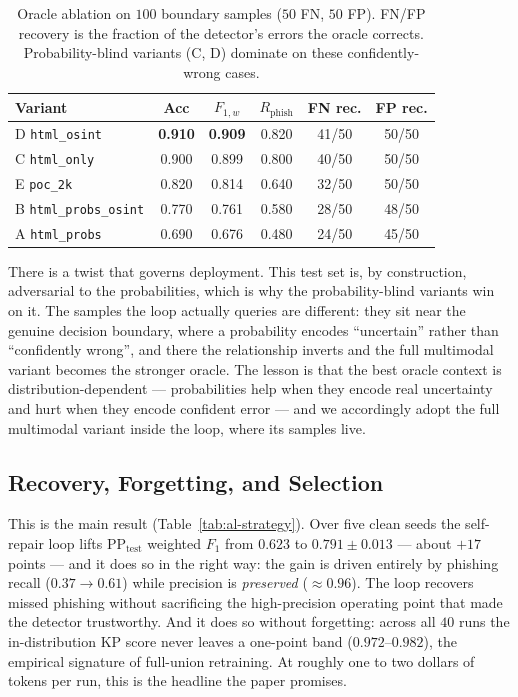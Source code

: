 \begin{table}[H]
\centering
\caption{Oracle ablation on $100$ boundary samples ($50$ FN, $50$ FP). FN/FP
recovery is the fraction of the detector's errors the oracle corrects.
Probability-blind variants (C, D) dominate on these confidently-wrong cases.}
\label{tab:oracle}
\small
\begin{tabular}{@{}lccccc@{}}
\toprule
Variant & Acc & $F_{1,w}$ & $R_{\text{phish}}$ & FN rec. & FP rec. \\
\midrule
D \texttt{html\_osint}        & \textbf{0.910} & \textbf{0.909} & 0.820 & 41/50 & 50/50 \\
C \texttt{html\_only}         & 0.900 & 0.899 & 0.800 & 40/50 & 50/50 \\
E \texttt{poc\_2k}            & 0.820 & 0.814 & 0.640 & 32/50 & 50/50 \\
B \texttt{html\_probs\_osint} & 0.770 & 0.761 & 0.580 & 28/50 & 48/50 \\
A \texttt{html\_probs}        & 0.690 & 0.676 & 0.480 & 24/50 & 45/50 \\
\bottomrule
\end{tabular}
\end{table}

There is a twist that governs deployment. This test set is, by construction,
adversarial to the probabilities, which is why the probability-blind variants
win on it. The samples the loop actually queries are different: they sit near
the genuine decision boundary, where a probability encodes ``uncertain'' rather
than ``confidently wrong'', and there the relationship inverts and the full
multimodal variant becomes the stronger oracle. The lesson is that the best
oracle context is distribution-dependent --- probabilities help when they encode
real uncertainty and hurt when they encode confident error --- and we accordingly
adopt the full multimodal variant inside the loop, where its samples live.

\subsection{Recovery, Forgetting, and Selection}
\label{ssec:eval-recovery}

This is the main result (Table~\ref{tab:al-strategy}). Over five clean seeds the
self-repair loop lifts $\mathrm{PP_{test}}$ weighted $F_1$ from $0.623$ to
$\mathbf{0.791 \pm 0.013}$ --- about $+17$ points --- and it does so in the right
way: the gain is driven entirely by phishing recall ($0.37 \to 0.61$) while
precision is \emph{preserved} ($\approx 0.96$). The loop recovers missed
phishing without sacrificing the high-precision operating point that made the
detector trustworthy. And it does so without forgetting: across all $40$ runs the
in-distribution KP score never leaves a one-point band ($0.972$--$0.982$), the
empirical signature of full-union retraining. At roughly one to two dollars of
tokens per run, this is the headline the paper promises.

